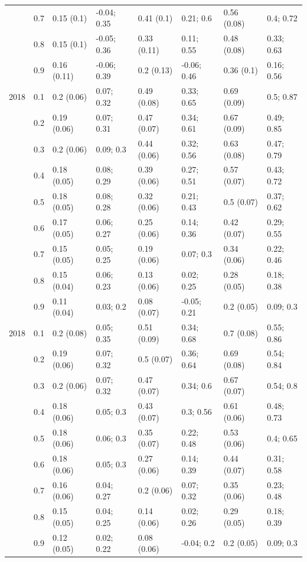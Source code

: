 \begin{landscape}
\begin{table}
{\begin{tabular}[t]{llllllll}
 & 0.7 & 0.15 (0.1) & -0.04; 0.35 & 0.41 (0.1) & 0.21; 0.6 & 0.56 (0.08) & 0.4; 0.72\\
 & 0.8 & 0.15 (0.1) & -0.05; 0.36 & 0.33 (0.11) & 0.11; 0.55 & 0.48 (0.08) & 0.33; 0.63\\
 & 0.9 & 0.16 (0.11) & -0.06; 0.39 & 0.2 (0.13) & -0.06; 0.46 & 0.36 (0.1) & 0.16; 0.56\\
2018 & 0.1 & 0.2 (0.06) & 0.07; 0.32 & 0.49 (0.08) & 0.33; 0.65 & 0.69 (0.09) & 0.5; 0.87\\
 & 0.2 & 0.19 (0.06) & 0.07; 0.31 & 0.47 (0.07) & 0.34; 0.61 & 0.67 (0.09) & 0.49; 0.85\\
 & 0.3 & 0.2 (0.06) & 0.09; 0.3 & 0.44 (0.06) & 0.32; 0.56 & 0.63 (0.08) & 0.47; 0.79\\
 & 0.4 & 0.18 (0.05) & 0.08; 0.29 & 0.39 (0.06) & 0.27; 0.51 & 0.57 (0.07) & 0.43; 0.72\\
 & 0.5 & 0.18 (0.05) & 0.08; 0.28 & 0.32 (0.06) & 0.21; 0.43 & 0.5 (0.07) & 0.37; 0.62\\
 & 0.6 & 0.17 (0.05) & 0.06; 0.27 & 0.25 (0.06) & 0.14; 0.36 & 0.42 (0.07) & 0.29; 0.55\\
 & 0.7 & 0.15 (0.05) & 0.05; 0.25 & 0.19 (0.06) & 0.07; 0.3 & 0.34 (0.06) & 0.22; 0.46\\
 & 0.8 & 0.15 (0.04) & 0.06; 0.23 & 0.13 (0.06) & 0.02; 0.25 & 0.28 (0.05) & 0.18; 0.38\\
 & 0.9 & 0.11 (0.04) & 0.03; 0.2 & 0.08 (0.07) & -0.05; 0.21 & 0.2 (0.05) & 0.09; 0.3\\
2018 & 0.1 & 0.2 (0.08) & 0.05; 0.35 & 0.51 (0.09) & 0.34; 0.68 & 0.7 (0.08) & 0.55; 0.86\\
 & 0.2 & 0.19 (0.06) & 0.07; 0.32 & 0.5 (0.07) & 0.36; 0.64 & 0.69 (0.08) & 0.54; 0.84\\
 & 0.3 & 0.2 (0.06) & 0.07; 0.32 & 0.47 (0.07) & 0.34; 0.6 & 0.67 (0.07) & 0.54; 0.8\\
 & 0.4 & 0.18 (0.06) & 0.05; 0.3 & 0.43 (0.07) & 0.3; 0.56 & 0.61 (0.06) & 0.48; 0.73\\
 & 0.5 & 0.18 (0.06) & 0.06; 0.3 & 0.35 (0.07) & 0.22; 0.48 & 0.53 (0.06) & 0.4; 0.65\\
 & 0.6 & 0.18 (0.06) & 0.05; 0.3 & 0.27 (0.06) & 0.14; 0.39 & 0.44 (0.07) & 0.31; 0.58\\
 & 0.7 & 0.16 (0.06) & 0.04; 0.27 & 0.2 (0.06) & 0.07; 0.32 & 0.35 (0.06) & 0.23; 0.48\\
 & 0.8 & 0.15 (0.05) & 0.04; 0.25 & 0.14 (0.06) & 0.02; 0.26 & 0.29 (0.05) & 0.18; 0.39\\
 & 0.9 & 0.12 (0.05) & 0.02; 0.22 & 0.08 (0.06) & -0.04; 0.2 & 0.2 (0.05) & 0.09; 0.3\\
\bottomrule
\end{tabular}}
\end{table}
\end{landscape}
